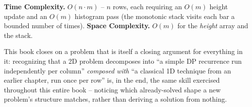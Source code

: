 \begin{complexitybox}
\textbf{Time Complexity.} $O(n \cdot m)$ -- $n$ rows, each requiring an
$O(m)$ height update and an $O(m)$ histogram pass (the monotonic stack
visits each bar a bounded number of times).
\textbf{Space Complexity.} $O(m)$ for the \textit{height} array and the
stack.
\end{complexitybox}

\begin{takeawaybox}
This book closes on a problem that is itself a closing argument for
everything in it: recognizing that a 2D problem decomposes into ``a
simple DP recurrence run independently per column'' \emph{composed
with} ``a classical 1D technique from an earlier chapter, run once per
row'' is, in the end, the same skill exercised throughout this entire
book -- noticing which already-solved shape a new problem's structure
matches, rather than deriving a solution from nothing.
\end{takeawaybox}
